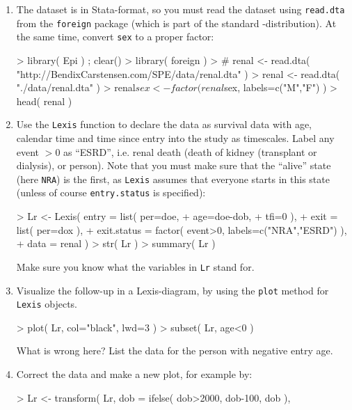 \begin{enumerate}
\item The dataset is in Stata-format, so you must read the dataset
  using \texttt{read.dta} from the \texttt{foreign} package (which is
  part of the standard \R-distribution). At the same time, convert
  \texttt{sex} to a proper factor:
\begin{Schunk}
\begin{Sinput}
> library( Epi ) ; clear()
> library( foreign )
> # renal <- read.dta( "http://BendixCarstensen.com/SPE/data/renal.dta" )
> renal <- read.dta( "./data/renal.dta" )
> renal$sex <- factor( renal$sex, labels=c("M","F") )
> head( renal )
\end{Sinput}
\end{Schunk}
\item Use the \texttt{Lexis} function to declare the data as
  survival data with age, calendar time and time since entry into
  the study as timescales. Label any event $>0$ as ``ESRD'',
  i.e. renal death (death of kidney (transplant or dialysis), or
  person).
  Note that you must make sure that the ``alive'' state (here
  \texttt{NRA}) is the first, as \texttt{Lexis} assumes that
  everyone starts in this state (unless of course
  \texttt{entry.status} is specified):
\begin{Schunk}
\begin{Sinput}
> Lr <- Lexis( entry = list( per=doe,
+                            age=doe-dob,
+                            tfi=0 ),
+               exit = list( per=dox ),
+        exit.status = factor( event>0, labels=c("NRA","ESRD") ),
+               data = renal )
> str( Lr )
> summary( Lr )
\end{Sinput}
\end{Schunk}
Make sure you know what the variables in \texttt{Lr} stand for.
\item Visualize the follow-up in a Lexis-diagram, by using the
  \texttt{plot} method for \texttt{Lexis} objects.
\begin{Schunk}
\begin{Sinput}
> plot( Lr, col="black", lwd=3 )
> subset( Lr, age<0 )
\end{Sinput}
\end{Schunk}
What is wrong here? List the data for the person with negative entry age.
\item Correct the data and make a new plot, for example by:
\begin{Schunk}
\begin{Sinput}
> Lr <- transform( Lr, dob = ifelse( dob>2000, dob-100, dob ),

\end{Sinput}
\end{Schunk}
\end{enumerate}
